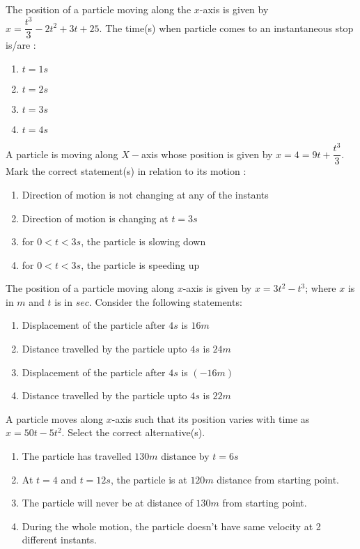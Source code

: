 \item The position of a particle moving along the $x$-axis is given by $x = \dfrac{t^3}{3} -2t^2 + 3t + 25$. The time(s) when particle comes to an instantaneous stop is/are :
\begin{multicols}{4}
\begin{enumerate}
\item $t=1 s$
\item $t=2 s$
\item $t=3 s$
\item $t=4 s$
\end{enumerate}
\end{multicols}

\item A particle is moving along $X-$axis whose position is given by $x=4=9t + \dfrac{t^3}{3}$. Mark the correct statement(s) in relation to its motion :
\begin{enumerate}
\item Direction of motion is not changing at any of the instants
\item Direction of motion is changing at $t=3s$
\item for $0 < t < 3 s$, the particle is slowing down
\item for $0 < t <3 s$, the particle is speeding up
\end{enumerate}


\item The position of a particle moving along $x$-axis is given by $x=3t^2-t^3$; where $x$ is in $m$ and $t$ is in $sec$. Consider the following statements:
\begin{enumerate}
\item Displacement of the particle after $4s$ is $16 m$
\item Distance travelled by the particle upto $4s$ is $24 m$
\item Displacement of the particle after $4s$ is $(-16m)$
\item Distance travelled by the particle upto $4s$ is $22 m$
\end{enumerate}

\item  A particle moves along $x$-axis such that its position varies with time as $x=50t-5t^2$. Select the correct alternative(s).
\begin{enumerate}
\item The particle has travelled $130 m$ distance by $t=6s$
\item At $t=4$ and $ t= 12 s$, the particle is at $120m$ distance from starting point.
\item The particle will never be at distance of $130m$ from starting point.
\item During the whole motion, the particle doesn't have same velocity at 2 different instants.
\end{enumerate}

